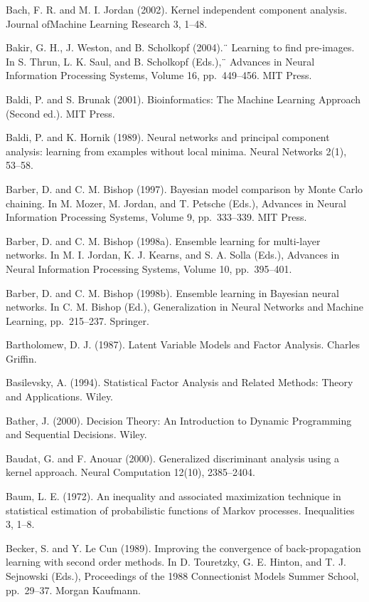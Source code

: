 \documentclass[
  10
]{article}
\begin{document}
Bach, F. R. and M. I. Jordan (2002). Kernel independent component
analysis. Journal ofMachine Learning Research 3, 1--48.

Bakir, G. H., J. Weston, and B. Scholkopf (2004).¨ Learning to find
pre-images. In S. Thrun, L. K. Saul, and B. Scholkopf (Eds.),¨ Advances
in Neural Information Processing Systems, Volume 16, pp.~449--456. MIT
Press.

Baldi, P. and S. Brunak (2001). Bioinformatics: The Machine Learning
Approach (Second ed.). MIT Press.

Baldi, P. and K. Hornik (1989). Neural networks and principal component
analysis: learning from examples without local minima. Neural Networks
2(1), 53--58.

Barber, D. and C. M. Bishop (1997). Bayesian model comparison by Monte
Carlo chaining. In M. Mozer, M. Jordan, and T. Petsche (Eds.), Advances
in Neural Information Processing Systems, Volume 9, pp.~333--339. MIT
Press.

Barber, D. and C. M. Bishop (1998a). Ensemble learning for multi-layer
networks. In M. I. Jordan, K. J. Kearns, and S. A. Solla (Eds.),
Advances in Neural Information Processing Systems, Volume 10,
pp.~395--401.

Barber, D. and C. M. Bishop (1998b). Ensemble learning in Bayesian
neural networks. In C. M. Bishop (Ed.), Generalization in Neural
Networks and Machine Learning, pp.~215--237. Springer.

Bartholomew, D. J. (1987). Latent Variable Models and Factor Analysis.
Charles Griffin.

Basilevsky, A. (1994). Statistical Factor Analysis and Related Methods:
Theory and Applications. Wiley.

Bather, J. (2000). Decision Theory: An Introduction to Dynamic
Programming and Sequential Decisions. Wiley.

Baudat, G. and F. Anouar (2000). Generalized discriminant analysis using
a kernel approach. Neural Computation 12(10), 2385--2404.

Baum, L. E. (1972). An inequality and associated maximization technique
in statistical estimation of probabilistic functions of Markov
processes. Inequalities 3, 1--8.

Becker, S. and Y. Le Cun (1989). Improving the convergence of
back-propagation learning with second order methods. In D. Touretzky, G.
E. Hinton, and T. J. Sejnowski (Eds.), Proceedings of the 1988
Connectionist Models Summer School, pp.~29--37. Morgan Kaufmann.
\end{document}
